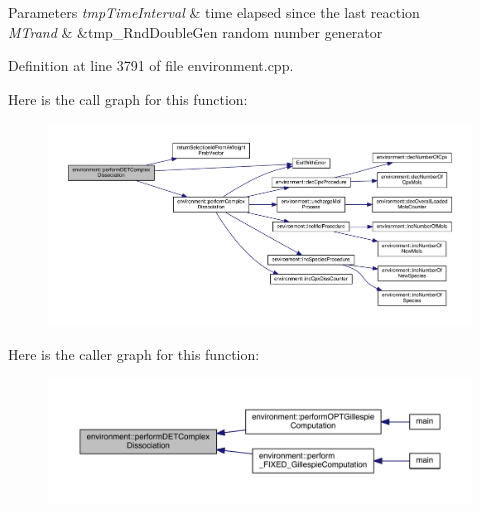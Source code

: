 \begin{DoxyParams}{Parameters}
{\em tmp\-Time\-Interval} & time elapsed since the last reaction \\
\hline
{\em M\-Trand} & \&tmp\-\_\-\-Rnd\-Double\-Gen random number generator \\
\hline
\end{DoxyParams}


Definition at line 3791 of file environment.\-cpp.



Here is the call graph for this function\-:
\nopagebreak
\begin{figure}[H]
\begin{center}
\leavevmode
\includegraphics[width=350pt]{a00014_a6ae793f9d2dca0632239be955dd83cee_cgraph}
\end{center}
\end{figure}




Here is the caller graph for this function\-:
\nopagebreak
\begin{figure}[H]
\begin{center}
\leavevmode
\includegraphics[width=350pt]{a00014_a6ae793f9d2dca0632239be955dd83cee_icgraph}
\end{center}
\end{figure}


